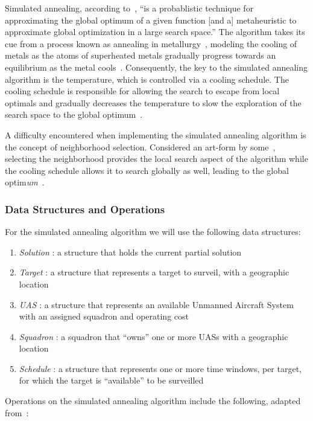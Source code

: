 \documentclass[conference]{IEEEtran}
\begin{document}
Simulated annealing, according to~\cite{wiki:SA}, ``is a probablistic technique
for approximating the global optimum of a given function [and a] metaheuristic
to approximate global optimization in a large search space.'' The algorithm
takes its cue from a process known as annealing in metallurgy~\cite{lamontSA},
modeling the cooling of metals as the atoms of superheated metals gradually
progress towards an equilibrium as the metal cools~\cite{talbi2009,
wiki:metal}.  Consequently, the key to the simulated annealing algorithm is the
temperature, which is controlled via a cooling schedule. The cooling schedule
is responsible for allowing the search to escape from local optimals and
gradually decreases the temperature to slow the exploration of the search space
to the global optimum~\cite{lamontSA, talbi2009}. 

A difficulty encountered when implementing the simulated annealing algorithm is
the concept of neighborhood selection. Considered an art-form by
some~\cite{hw9}, selecting the neighborhood provides the local search aspect of
the algorithm while the cooling schedule allows it to search globally as well,
leading to the global optim\emph{um}~\cite{wiki:SA}.

\subsubsection{Data Structures and Operations} \label{sec:SAdata}

For the simulated annealing algorithm we will use the following data
structures:

\begin{enumerate}
  \item[] \emph{Solution} : a structure that holds the current partial solution
  \item[] \emph{Target} : a structure that represents a target to surveil, with
    a geographic location
  \item[] \emph{UAS} : a structure that represents an available Unmanned
    Aircraft System with an assigned squadron and operating cost
  \item[] \emph{Squadron} : a squadron that ``owns'' one or more UASs with a
    geographic location
  \item[] \emph{Schedule} : a structure that represents one or more time
    windows, per target, for which the target is ``available'' to be surveilled
\end{enumerate}

Operations on the simulated annealing algorithm include the following, adapted
from~\cite{lamontSAGS}:
\end{document}
